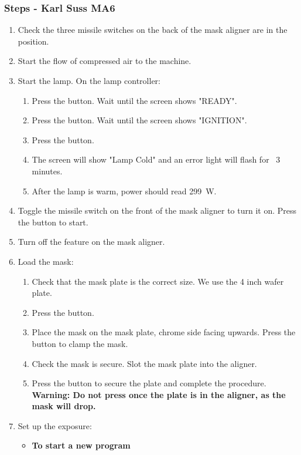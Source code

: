 \subsubsection{Steps - Karl Suss MA6}
\begin{enumerate}
\item Check the three missile switches on the back of the mask aligner are in the  position.
\item Start the flow of compressed air to the machine.
\item Start the lamp. On the lamp controller:
\begin{enumerate}
  \item Press the  button. Wait until the screen shows "READY".
  \item Press the  button. Wait until the screen shows "IGNITION".
  \item Press the  button.
  \item The screen will show "Lamp Cold" and an error light will flash for ~3 minutes.
  \item After the lamp is warm, power should read \SI{299}{W}.
\end{enumerate}
\item Toggle the missile switch on the front of the mask aligner to turn it on. Press the 
      button to start.
\item Turn off the  feature on the mask aligner.
\item Load the mask:
\begin{enumerate}
  \item Check that the mask plate is the correct size. We use the 4 inch wafer plate.
  \item Press the  button.
  \item Place the mask on the mask plate, chrome side facing upwards. Press the  button to clamp the mask.
  \item Check the mask is secure. Slot the mask plate into the aligner.
  \item Press the  button to secure the plate and complete the procedure. \textbf{Warning: Do not press
         once the plate is in the aligner, as the mask will drop.}
\end{enumerate}
\item Set up the exposure:
\begin{itemize} [noitemsep, nolistsep]
  \item \textbf{To start a new program}

\end{itemize}
\end{enumerate}
